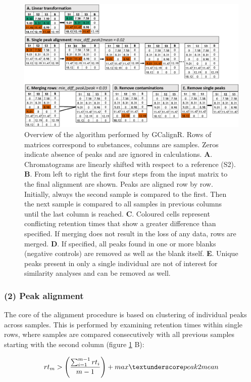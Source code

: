 \begin{figure}[htbp]
\centering
\includegraphics[width=13cm]{figures/algorithm}
\caption{Overview of the algorithm performed by GCalignR. Rows of matrices correspond to substances, columns are samples. Zeros indicate absence of peaks and are ignored in calculations. \textbf{A}. Chromatograms are linearly shifted with respect to a reference (S2). \textbf{B}. From left to right the first four steps from the input matrix to the final alignment are shown. Peaks are aligned row by row. Initially, always the second sample is compared to the first. Then the next sample is compared to all samples in previous columns until the last column is reached. \textbf{C}. Coloured cells represent conflicting retention times that show a greater difference than specified. If merging does not result in the loss of any data, rows are merged. \textbf{D}. If specified, all peaks found in one or more blanks (negative controls) are removed as well as the blank itself. \textbf{E}. Unique peaks present in only a single individual are not of interest for similarity analyses and can be removed as well.}
\label{figure:algorithm}
\end{figure}

\subsubsection{(2) Peak alignment}\label{peak-alignment}

The core of the alignment procedure is based on clustering of individual
peaks across samples. This is performed by examining retention times
within single rows, where samples are compared consecutively with all
previous samples starting with the second column (figure
\ref{figure:algorithm} B):

\begin{equation}
rt_{m} > \left(\frac{\sum_{i=1}^{m-1}rt_{i}}{m-1}\right) + max\textunderscore peak2mean
\end{equation}

